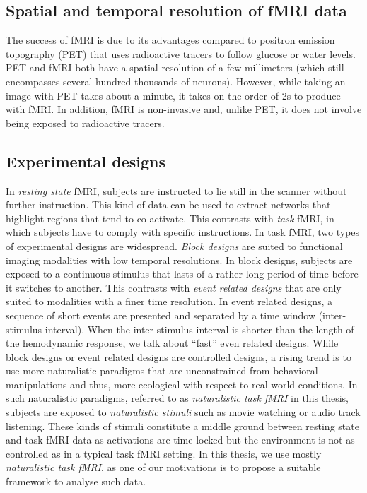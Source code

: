 \subsection{Spatial and temporal resolution of fMRI data}
The success of fMRI is due to its advantages compared to positron
emission topography (PET) that uses radioactive tracers to follow glucose or water levels.
PET and fMRI both have a spatial resolution of a few millimeters (which still
encompasses several hundred thousands of neurons).
However, while taking an image with PET takes about a minute, it takes on
the order of 2s to produce with fMRI.
In addition, fMRI is non-invasive and, unlike PET, it does not involve being exposed to radioactive tracers.

\subsection{Experimental designs}
In \emph{resting state} fMRI, subjects are instructed to lie still in the scanner without further instruction.
This kind of data can be used to extract networks that highlight regions that tend to co-activate.
This contrasts with \emph{task} fMRI, in which subjects have to comply with specific instructions.
In task fMRI, two types of experimental designs are widespread.
\emph{Block designs} are suited to functional
imaging modalities with low temporal resolutions.
In block designs, subjects are exposed to a continuous stimulus that lasts of a
rather long period of time before it switches to another.
This contrasts with \emph{event related designs} that are only suited to modalities with a finer time resolution. In event related designs, a sequence of short events are presented and separated by a time window (inter-stimulus interval).
When the inter-stimulus interval is shorter than the length of the hemodynamic response, we talk about ``fast'' even related designs.
While block designs or event related designs are controlled designs,
a rising trend is to use more naturalistic paradigms that are unconstrained from
behavioral manipulations and thus, more ecological with respect to real-world conditions.
In such naturalistic paradigms, referred to as \emph{naturalistic task fMRI} in
this thesis, subjects are exposed to \emph{naturalistic stimuli} such as movie
watching or audio track listening. These kinds of stimuli constitute a middle ground
between resting state and task fMRI data as activations are time-locked but the
environment is not as controlled as in a typical task fMRI setting.
%
In this thesis, we use mostly \emph{naturalistic task fMRI}, as one of our motivations is to propose a suitable framework to analyse such data.

